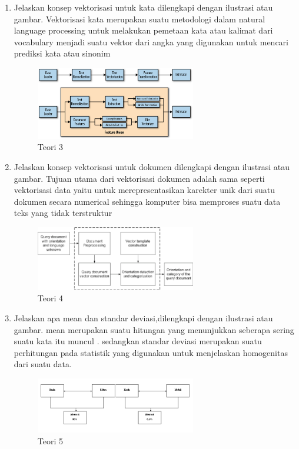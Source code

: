 \begin{enumerate}
	\item Jelaskan konsep vektorisasi untuk kata dilengkapi dengan ilustrasi atau gambar.
	\hfill\break
	Vektorisasi kata merupakan suatu metodologi dalam natural language processing untuk melakukan pemetaan 
    kata atau kalimat dari vocabulary menjadi suatu vektor dari angka yang digunakan untuk mencari prediksi kata atau sinonim
	\hfill\break
	\begin{figure}[H]
		\includegraphics[width=7cm]{figures/1174079/5/3.png}
		\centering
		\caption{Teori 3}
	\end{figure}

	\item Jelaskan konsep vektorisasi untuk dokumen dilengkapi dengan ilustrasi atau gambar.
	\hfill\break
	Tujuan utama dari vektorisasi dokumen adalah sama seperti vektorisasi data yaitu untuk merepresentasikan karekter unik dari suatu dokumen secara numerical sehingga komputer bisa memproses suatu data teks yang tidak terstruktur
	\hfill\break
	\begin{figure}[H]
		\includegraphics[width=7cm]{figures/1174079/5/4.png}
		\centering
		\caption{Teori 4}
	\end{figure}

	\item Jelaskan apa mean dan standar deviasi,dilengkapi dengan ilustrasi atau gambar.
	\hfill\break
    mean merupakan suatu hitungan yang menunjukkan seberapa sering suatu kata itu muncul . sedangkan standar deviasi merupakan suatu perhitungan pada statistik yang digunakan untuk menjelaskan homogenitas dari suatu data.
	\hfill\break
	\begin{figure}[H]
		\includegraphics[width=7cm]{figures/1174079/5/5.png}
		\centering
		\caption{Teori 5}
	\end{figure}


\end{enumerate}
